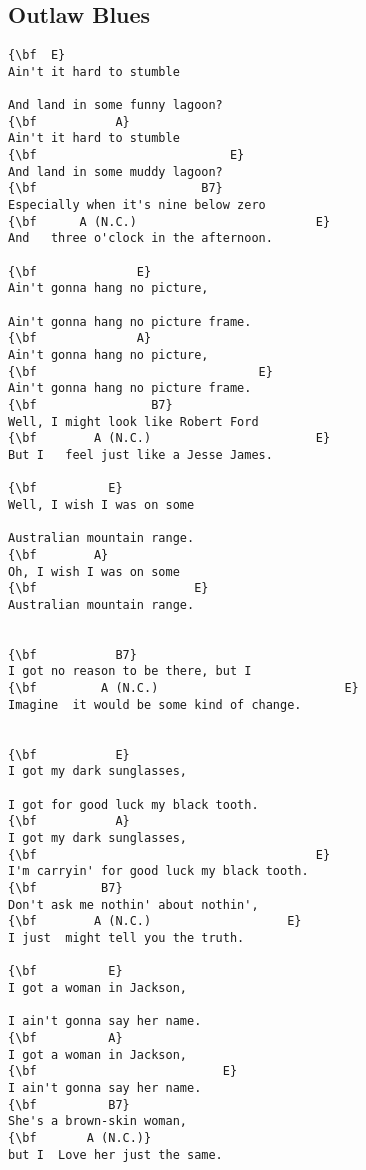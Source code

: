 \documentclass[a4paper]{article}
\begin{document}
\subsection{Outlaw Blues}
\begin{multicols}{2}\begin{Verbatim}[commandchars=\\\{\}]
{\bf  E}
Ain't it hard to stumble

And land in some funny lagoon?
{\bf           A}
Ain't it hard to stumble
{\bf                           E}
And land in some muddy lagoon?
{\bf                       B7}
Especially when it's nine below zero
{\bf      A (N.C.)                         E}
And   three o'clock in the afternoon.

{\bf              E}
Ain't gonna hang no picture,

Ain't gonna hang no picture frame.
{\bf              A}
Ain't gonna hang no picture,
{\bf                               E}
Ain't gonna hang no picture frame.
{\bf                B7}
Well, I might look like Robert Ford
{\bf        A (N.C.)                       E}
But I   feel just like a Jesse James.

{\bf          E}
Well, I wish I was on some

Australian mountain range.
{\bf        A}
Oh, I wish I was on some
{\bf                      E}
Australian mountain range.


{\bf           B7}
I got no reason to be there, but I
{\bf         A (N.C.)                          E}
Imagine  it would be some kind of change.


{\bf           E}
I got my dark sunglasses,

I got for good luck my black tooth.
{\bf           A}
I got my dark sunglasses,
{\bf                                       E}
I'm carryin' for good luck my black tooth.
{\bf         B7}
Don't ask me nothin' about nothin',
{\bf        A (N.C.)                   E}
I just  might tell you the truth.

{\bf          E}
I got a woman in Jackson,

I ain't gonna say her name.
{\bf          A}
I got a woman in Jackson,
{\bf                          E}
I ain't gonna say her name.
{\bf          B7}
She's a brown-skin woman,
{\bf       A (N.C.)}
but I  Love her just the same.

\end{Verbatim}
\end{multicols}\newpage
\end{document}
